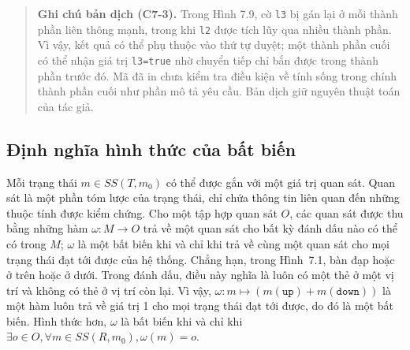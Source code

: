 \begin{quote}
\small\textbf{Ghi chú bản dịch (C7-3).} Trong Hình 7.9, cờ \texttt{l3} bị gán lại ở mỗi thành phần liên thông mạnh, trong khi \texttt{l2} được tích lũy qua nhiều thành phần. Vì vậy, kết quả có thể phụ thuộc vào thứ tự duyệt; một thành phần cuối có thể nhận giá trị \texttt{l3=true} nhờ chuyển tiếp chỉ bắn được trong thành phần trước đó. Mã đã in chưa kiểm tra điều kiện về tính sống trong chính thành phần cuối như phần mô tả yêu cầu. Bản dịch giữ nguyên thuật toán của tác giả.
\end{quote}


\subsection{Định nghĩa hình thức của bất biến}
Mỗi trạng thái $m\in SS(T,m_0)$ có thể được gắn với một giá trị quan sát. Quan sát là một phần tóm lược của trạng thái, chỉ chứa thông tin liên quan đến những thuộc tính được kiểm chứng. Cho một tập hợp quan sát $O$, các quan sát được thu bằng những hàm $\omega:M\to O$ trả về một quan sát cho bất kỳ đánh dấu nào có thể có trong $M$; $\omega$ là một bất biến khi và chỉ khi trả về cùng một quan sát cho mọi trạng thái đạt tới được của hệ thống. Chẳng hạn, trong Hình~7.1, bàn đạp hoặc ở trên hoặc ở dưới. Trong đánh dấu, điều này nghĩa là luôn có một thẻ ở một vị trí và không có thẻ ở vị trí còn lại. Vì vậy, $\omega:m\mapsto(m(\texttt{up})+m(\texttt{down}))$ là một hàm luôn trả về giá trị 1 cho mọi trạng thái đạt tới được, do đó là một bất biến. Hình thức hơn, $\omega$ là bất biến khi và chỉ khi $\exists o\in O,\forall m\in SS(R,m_0),\omega(m)=o$.

